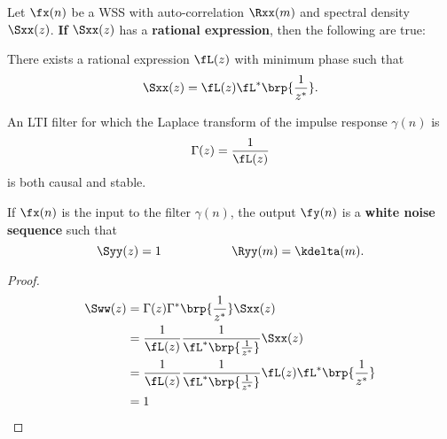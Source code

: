 \begin{theorem}
\label{thm:d-innovations}
Let $\fx(n)$ be a WSS  with auto-correlation $\Rxx(m)$
and spectral density $\Sxx(z)$.
\textbf{If} $\Sxx(z)$ has a \textbf{rational expression},
then the following are true:

\begin{enume}
   \item There exists a rational expression $\fL(z)$ with minimum phase
         such that
         \[ \Sxx(z) =\fL(z)\fL^\ast\brp{\frac{1}{z^\ast}}. \]
   \item An LTI filter for which the Laplace transform of
         the impulse response $\gamma(n)$ is
         \[ \Gamma(z) = \frac{1}{\fL(z)} \]
         is both causal and stable.
   \item If $\fx(n)$ is the input to the filter $\gamma(n)$,
         the output $\fy(n)$ is a \textbf{white noise sequence} such that
         \[ \Syy(z)=1 \hspace{2cm} \Ryy(m)=\kdelta(m).\]
\end{enume}
\end{theorem}


\begin{proof}
\begin{align*}
   \Sww(z)
     &= \Gamma(z)\Gamma^\ast\brp{\frac{1}{z^\ast}} \Sxx(z)
   \\&= \frac{1}{\fL(z)} \frac{1}{\fL^\ast\brp{\frac{1}{z^\ast}}} \Sxx(z)
   \\&= \frac{1}{\fL(z)} \frac{1}{\fL^\ast\brp{\frac{1}{z^\ast}}}
        \fL(z)\fL^\ast\brp{\frac{1}{z^\ast}}
   \\&= 1
\end{align*}
\end{proof}

